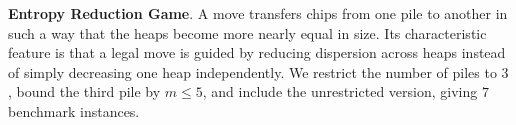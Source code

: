 \documentclass[review]{elsarticle}
\newcommand{\set}[1]{\{ #1 \}}
\newcommand{\tuple}[1]{\langle {#1} \rangle}
\newcommand{\true}{\top}
\newcommand{\statevar}{\mathcal{X}}
\newcommand{\act}{\mathcal{A}}
\newcommand{\constraint}{\mathcal{C}}
\newcommand{\estate}{\mathcal{E}}
\newcommand{\pre}{\mathtt{pre}}
\newcommand{\eff}{\mathtt{eff}}
\begin{document}
{\color{red}\textbf{Entropy Reduction Game}. A move transfers chips from one pile to another in such a way that the heaps become more nearly equal in size.}
{\color{red}Its characteristic feature is that a legal move is guided by reducing dispersion across heaps instead of simply decreasing one heap independently.}
{\color{red}We restrict the number of piles to $3$, bound the third pile by $m \le 5$, and include the unrestricted version, giving $7$ benchmark instances.}
\end{document}
